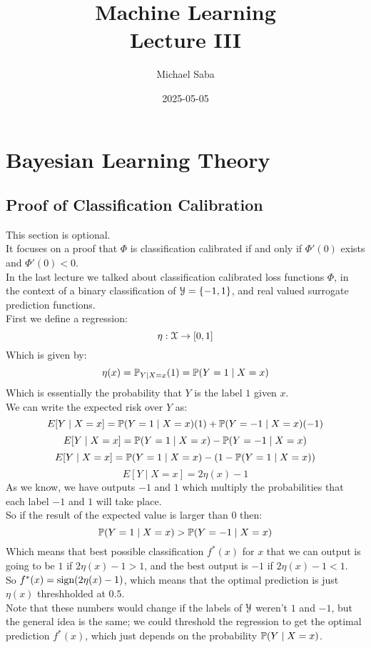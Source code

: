 \documentclass[12pt]{article}
\title{%
    \Huge Machine Learning \\
    \Large Lecture III
}
\date{2025-05-05}
\author{Michael Saba}
\begin{document}
\maketitle
\newpage
\setlength{\parindent}{0pt}

\section*{Bayesian Learning Theory}

\subsection*{Proof of Classification Calibration}

This section is optional. \\
It focuses on a proof that $\Phi$
is classification calibrated
if and only if $\Phi'(0)$ exists
and $\Phi'(0) < 0$. \\

In the last lecture we
talked about classification calibrated
loss functions $\Phi$,
in the context of a binary classification
of $\mathcal{Y} = \{-1, 1\}$,
and real valued surrogate prediction
functions. \\

First we define a regression:
\[ \eta: \mathcal{X} \to [0, 1] \]
Which is given by:
\[ \eta(x) = \mathbb{P}_{Y \mid X = x}(1)
= \mathbb{P}(Y = 1 \mid X = x) \]
Which is essentially the probability
that $Y$ is the label $1$
given $x$. \\

We can write the expected risk over $Y$ as:
\[ E[Y \mid X = x]
= \mathbb{P}(Y = 1\mid X = x)(1)
+ \mathbb{P}(Y = -1 \mid X = x)(-1) \]
\[ E[Y \mid X = x] 
= \mathbb{P}(Y = 1\mid X = x)
- \mathbb{P}(Y = -1 \mid X = x) \]
\[  E[Y \mid X = x] 
= \mathbb{P}(Y = 1\mid X = x)
- (1 - \mathbb{P}(Y = 1\mid X = x)) \]
\[ E[Y \mid X = x] 
= 2\eta(x) - 1  \]
As we know, we have outputs
$-1$ and $1$ which multiply the
probabilities that each label $-1$
and $1$ will take place. \\
So if the result of the expected
value is larger than $0$
then: 
\[ \mathbb{P}(Y = 1 \mid X = x) >
\mathbb{P}(Y = -1 \mid X = x) \]
Which means that best possible
classification $f^*(x)$
for $x$
that we can output
is going to be $1$ if $2\eta(x) - 1 > 1$,
and the best output is $-1$ 
if $2\eta(x) - 1 < 1$. \\

So $f^*(x) = \text{sign}(2\eta(x) - 1)$,
which means that the optimal prediction
is just $\eta(x)$ threshholded
at $0.5$. \\
Note that these numbers would change
if the labels of $\mathcal{Y}$
weren't $1$ and $-1$,
but the general idea is the same;
we could threshold the regression
to get the optimal prediction $f^*(x)$,
which just depends on the probability
$\mathbb{P}(Y \mid X = x)$. \\
\end{document}
